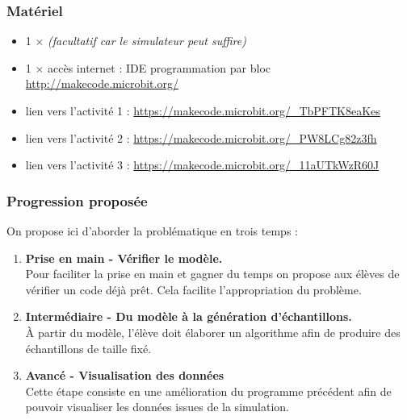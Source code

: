 \subsubsection{Matériel}
\begin{itemize}
    \item 1 $\times$ \matosMb \emph{(facultatif car le simulateur peut suffire)}
    \item 1 $\times$ accès internet : IDE programmation par bloc \url{http://makecode.microbit.org/}
    \item lien vers l'activité 1 : \url{https://makecode.microbit.org/_TbPFTK8eaKes}
    \item lien vers l'activité 2 : \url{https://makecode.microbit.org/_PW8LCg82z3fh}
    \item lien vers l'activité 3 :
    \url{https://makecode.microbit.org/_11aUTkWzR60J}
\end{itemize}

\newpage

\subsubsection{Progression proposée}


\begin{methode}
    On propose ici d'aborder la problématique en trois temps :
    
    \begin{enumerate}
        \item \textbf{Prise en main - Vérifier le modèle.} \\
            Pour faciliter la prise en main et gagner du temps on propose aux élèves de vérifier un code déjà prêt. Cela facilite l'appropriation du problème.
        \item \textbf{Intermédiaire - Du modèle à la génération d'échantillons.}\\
            À partir du modèle, l'élève doit élaborer un algorithme afin de produire des échantillons de taille fixé.
        \item \textbf{Avancé - Visualisation des données}\\
            Cette étape consiste en une amélioration du programme précédent afin de pouvoir visualiser les données issues de la simulation.
            
    \end{enumerate}
\end{methode}

